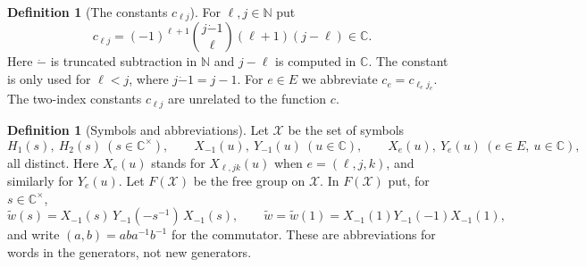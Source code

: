 \documentclass[11pt]{article}
\theoremstyle{definition}
\newtheorem{definition}[theorem]{Definition}
\theoremstyle{remark}
\newcommand{\CC}{\mathbb{C}}
\newcommand{\NN}{\mathbb{N}}
\newcommand{\monus}{\mathbin{\dot{-}}}
\newcommand{\wt}{\widetilde{w}}
\begin{document}
\begin{definition}[The constants $c_{\ell j}$]
For $\ell,j\in\NN$ put
\[
c_{\ell j}=(-1)^{\ell+1}\binom{j\monus 1}{\ell}(\ell+1)(j-\ell)\in\CC .
\]
Here $\monus$ is truncated subtraction in $\NN$ and $j-\ell$ is computed in $\CC$. The constant is only used for $\ell<j$, where $j\monus1=j-1$. For $e\in E$ we abbreviate $c_e=c_{\ell_e j_e}$. The two-index constants $c_{\ell j}$ are unrelated to the function $c$.
\end{definition}

\begin{definition}[Symbols and abbreviations]
Let $\mathcal X$ be the set of symbols
\[
H_1(s),\ H_2(s)\ (s\in\CC^\times),\qquad X_{-1}(u),\ Y_{-1}(u)\ (u\in\CC),\qquad X_e(u),\ Y_e(u)\ (e\in E,\ u\in\CC),
\]
all distinct. Here $X_e(u)$ stands for $X_{\ell,jk}(u)$ when $e=(\ell,j,k)$, and similarly for $Y_e(u)$. Let $F(\mathcal X)$ be the free group on $\mathcal X$. In $F(\mathcal X)$ put, for $s\in\CC^\times$,
\[
\wt(s)=X_{-1}(s)\,Y_{-1}(-s^{-1})\,X_{-1}(s),\qquad \wt=\wt(1)=X_{-1}(1)Y_{-1}(-1)X_{-1}(1),
\]
and write $(a,b)=aba^{-1}b^{-1}$ for the commutator. These are abbreviations for words in the generators, not new generators.
\end{definition}
\end{document}
